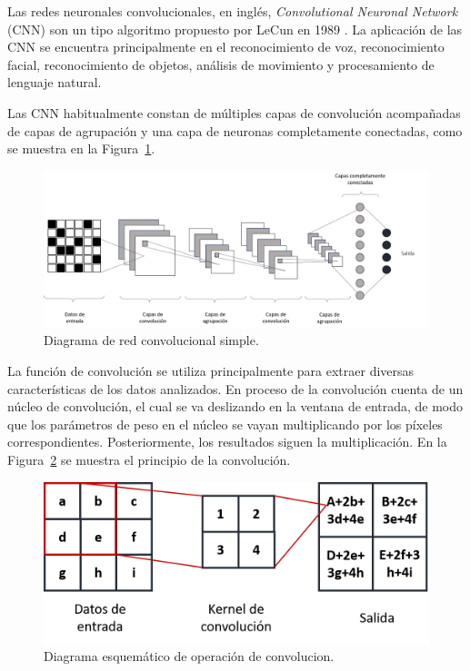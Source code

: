 Las redes neuronales convolucionales, en inglés, \textit{Convolutional Neuronal Network} (CNN) son un tipo algoritmo propuesto por LeCun en 1989 \citep{lecun1989backpropagation}. La aplicación de las CNN se encuentra principalmente en el reconocimiento de voz, reconocimiento facial, reconocimiento de objetos, análisis de movimiento y procesamiento de lenguaje natural.

Las CNN habitualmente constan de múltiples capas de convolución acompañadas de capas de agrupación y una capa de neuronas completamente conectadas, como se muestra en la Figura~\ref{fig:CNN}.

  \begin{figure}[!h]
     \centering
     \includegraphics[width=.9\textwidth]{Imagenes/CNN.png}
     \caption{Diagrama de red convolucional simple.}
     \label{fig:CNN}
 \end{figure}

 La función de convolución se utiliza principalmente para extraer diversas características de los datos analizados. En proceso de la convolución cuenta de un núcleo de convolución, el cual se va deslizando en la ventana de entrada, de modo que los parámetros de peso en el núcleo se vayan multiplicando por los píxeles correspondientes. Posteriormente, los resultados siguen la multiplicación. En la Figura~\ref{fig:Convolution} se muestra el principio de la convolución.

 \begin{figure}[!h]
     \centering
     \includegraphics[width=.5\textwidth]{Imagenes/Convolucion.png}
     \caption{Diagrama esquemático de operación de convolucion.}
     \label{fig:Convolution}
 \end{figure}

